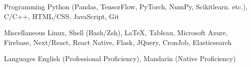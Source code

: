 

\begin{cvskills}

  \cvskill
    {Programming} %
    {Python (Pandas, TensorFlow, PyTorch, NumPy, Scikit\-learn. etc.),  C/C++, HTML/CSS, JavaScript, Git} %

  \cvskill
    {Miscellaneous} %
    {Linux, Shell (Bash/Zsh), \LaTeX, Tableau, Microsoft Azure, Firebase, Next/React, React Native, Flask, JQuery, CronJob, Elasticsearch} %
    
  \cvskill
    {Languages} %
    {English (Professional Proficiency), Mandarin (Native Proficiency)} %

\end{cvskills}
